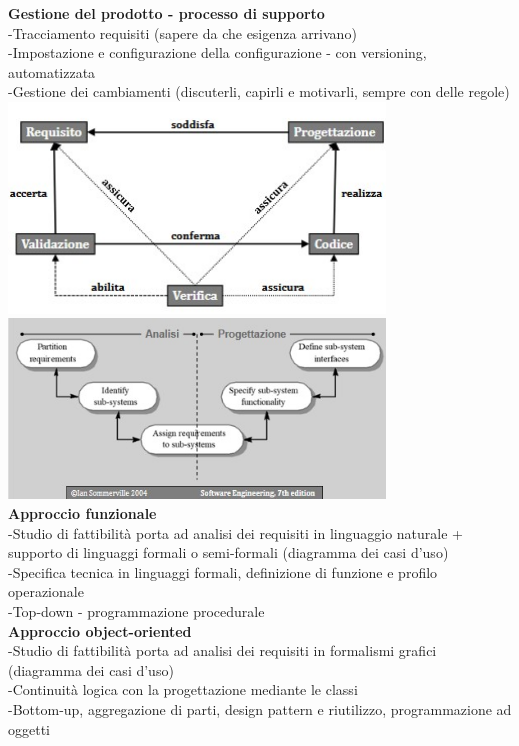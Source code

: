 \documentclass{article}
\begin{document}
		\textbf{Gestione del prodotto - processo di supporto}\\
		-Tracciamento requisiti (sapere da che esigenza arrivano)\\
		-Impostazione e configurazione della configurazione - con versioning, automatizzata\\
		-Gestione dei cambiamenti (discuterli, capirli e motivarli, sempre con delle regole)\\
		\includegraphics[width=10cm]{verifica.jpg}\\
		\includegraphics[width=10cm]{analisi_progettazione.jpg}\\
		
		\textbf{Approccio funzionale}\\
		-Studio di fattibilità porta ad analisi dei requisiti in linguaggio naturale + supporto di linguaggi formali o semi-formali (diagramma dei casi d'uso)\\
		-Specifica tecnica in linguaggi formali, definizione di funzione e profilo operazionale\\
		-Top-down - programmazione procedurale\\
		
		\textbf{Approccio object-oriented}\\
		-Studio di fattibilità porta ad analisi dei requisiti in formalismi grafici (diagramma dei casi d'uso)\\
		-Continuità logica con la progettazione mediante le classi\\
		-Bottom-up, aggregazione di parti, design pattern e riutilizzo, programmazione ad oggetti\\
		
\end{document}
